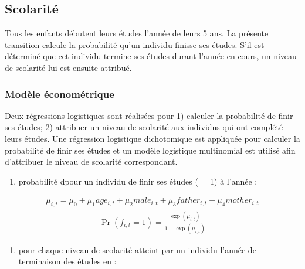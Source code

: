 \documentclass[letterpaper,10pt,french]{sphinxmanual}
\begin{document}
\subsection{Scolarité}
\label{\detokenize{methodologie:scolarite}}
Tous les enfants débutent leurs études l’année de leurs 5 ans.
La présente transition calcule la probabilité qu’un individu finisse ses études.
S’il est déterminé que cet individu termine ses études durant l’année en cours, un niveau de scolarité lui est ensuite attribué.


\subsubsection{Modèle économétrique}
\label{\detokenize{methodologie:model2}}\label{\detokenize{methodologie:id1}}
Deux régressions logistiques sont réalisées pour 1) calculer la probabilité de finir ses études; 2) attribuer un niveau de scolarité aux individus qui ont complété leurs études. Une régression logistique dichotomique est appliquée pour calculer la probabilité de finir ses études et un modèle logistique multinomial est utilisé afin d’attribuer le niveau de scolarité correspondant.
\begin{enumerate}
%
\item {} 
probabilité dpour un individu  de finir ses études ( = 1) à l’année :

\end{enumerate}
\begin{equation*}
\begin{split}\mu_{i,t} = \mu_{0} + \mu_{1} age_{i,t} + \mu_{2} male_{i,t} + \mu_{3} father_{i,t} + \mu_{4} mother_{i,t}\end{split}
\end{equation*}\begin{equation*}
\begin{split}\Pr(f_{i,t}=1) = \frac{\exp(\mu_{i,t})}{1+\exp(\mu_{i,t})}\end{split}
\end{equation*}\begin{enumerate}
%
\setcounter{enumi}{1}
\item {} 
pour chaque niveau de scolarité  atteint par un individu  l’année de terminaison des études en :

\end{enumerate}
\end{document}
